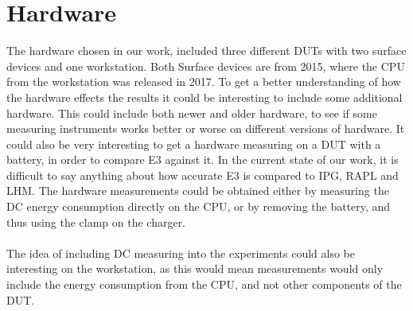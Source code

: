 \section{Hardware}

The hardware chosen in our work, included three different DUTs with two surface devices and one workstation. Both Surface devices are from 2015, where the CPU from the workstation was released in 2017. To get a better understanding of how the hardware effects the results it could be interesting to include some additional hardware. This could include both newer and older hardware, to see if some measuring instruments works better or worse on different versions of hardware. It could also be very interesting to get a hardware measuring on a DUT with a battery, in order to compare E3 against it. In the current state of our work, it is difficult to say anything about how accurate E3 is compared to IPG, RAPL and LHM. The hardware measurements could be obtained either by measuring the DC energy consumption directly on the CPU, or by removing the battery, and thus using the clamp on the charger.

\paragraph*{}
The idea of including DC measuring into the experiments could also be interesting on the workstation, as this would mean measurements would only include the energy consumption from the CPU, and not other components of the DUT.